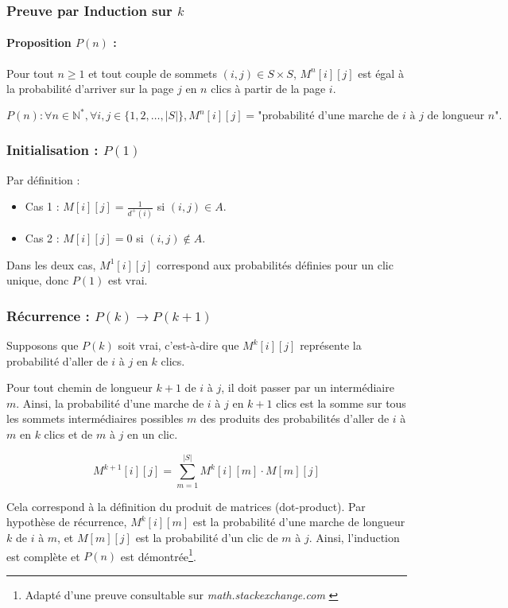\subsubsection{Preuve par Induction sur $k$}

\paragraph{Proposition $P(n)$ :} Pour tout $n \geq 1$ et tout couple de sommets $(i, j) \in S \times S$, $M^n[i][j]$ est égal à la probabilité d'arriver sur la page $j$ en $n$ clics à partir de la page $i$.

$$ P(n) : \forall n \in \mathbb{N^*}, \forall i, j \in \{1, 2, \ldots, |S|\}, M^n[i][j] = \text{"probabilité d'une marche de } i \text{ à } j \text{ de longueur } n \text{"}.$$


\subsubsection{Initialisation : $P(1)$}
Par définition :

\begin{itemize}
    \item Cas 1 : $M[i][j] = \frac{1}{d^+(i)}$ si $(i, j) \in A$.
    \item Cas 2 : $M[i][j] = 0$ si $(i, j) \notin A$.
\end{itemize}

Dans les deux cas, $M^1[i][j]$ correspond aux probabilités définies pour un clic unique, donc $P(1)$ est vrai.

\subsubsection{Récurrence : $P(k) \rightarrow P(k+1)$}
Supposons que $P(k)$ soit vrai, c'est-à-dire que $M^k[i][j]$ représente la probabilité d'aller de $i$ à $j$ en $k$ clics.

Pour tout chemin de longueur $k+1$ de $i$ à $j$, il doit passer par un intermédiaire $m$. Ainsi, la probabilité d'une marche de $i$ à $j$ en $k+1$ clics est la somme sur tous les sommets intermédiaires possibles $m$ des produits des probabilités d'aller de $i$ à $m$ en $k$ clics et de $m$ à $j$ en un clic.

\[
M^{k+1}[i][j] = \sum_{m=1}^{|S|}M^k[i][m] \cdot M[m][j]
\]

Cela correspond à la définition du produit de matrices (dot-product). Par hypothèse de récurrence, $M^k[i][m]$ est la probabilité d'une marche de longueur $k$ de $i$ à $m$, et $M[m][j]$ est la probabilité d'un clic de $m$ à $j$. Ainsi, l'induction est complète et $P(n)$ est démontrée\footnote{Adapté d'une preuve consultable sur \textit{math.stackexchange.com} \cite{ramirezamaya2017proof}}.

